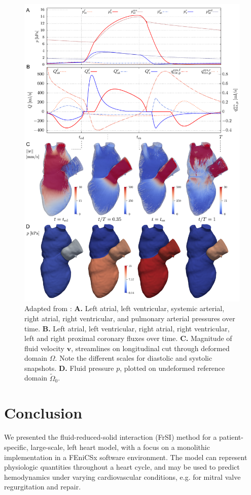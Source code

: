 \begin{figure}[!htp]
\centering
\includegraphics[width=1\textwidth]{heart_results.pdf}
\caption{Adapted from \cite{hirschvogel2025-prec}: \textbf{A.} Left atrial, left ventricular, systemic arterial, right atrial, right ventricular, and pulmonary arterial pressures over time. \textbf{B.} Left atrial, left ventricular, right atrial, right ventricular, left and right proximal coronary fluxes over time. \textbf{C.} Magnitude of fluid velocity $\boldsymbol{v}$, streamlines on longitudinal cut through deformed domain $\mathit{\Omega}$. Note the different scales for diastolic and systolic snapshots. \textbf{D.} Fluid pressure $p$, plotted on undeformed reference domain $\tilde{\mathit{\Omega}}_{0}$.}\label{fig:heart_results}
\end{figure}

\section*{Conclusion}
We presented the fluid-reduced-solid interaction (FrSI) method for a patient-specific, large-scale, left heart model, with a focus on a monolithic implementation in a FEniCSx software environment. The model can represent physiologic quantities throughout a heart cycle, and may be used to predict hemodynamics under varying cardiovascular conditions, e.g. for mitral valve regurgitation and repair.

